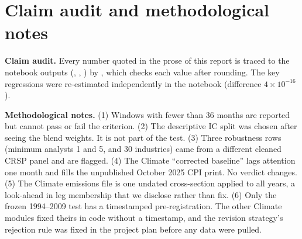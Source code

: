 \documentclass[11pt]{article}
\begin{document}
\section{Claim audit and methodological notes}
\label{app:audit}
\enlargethispage{\baselineskip}

\textbf{Claim audit.} Every number quoted in the prose of this report is traced to the notebook outputs (, , ) by , which checks each value after rounding. The key regressions were re-estimated independently in the notebook (difference $4\times10^{-16}$).

\textbf{Methodological notes.} (1) Windows with fewer than 36 months are reported but cannot pass or fail the criterion. (2) The descriptive IC split was chosen after seeing the blend weights. It is not part of the test. (3) Three robustness rows (minimum analysts 1 and 5, and 30 industries) came from a different cleaned CRSP panel and are flagged. (4) The Climate ``corrected baseline'' lags attention one month and fills the unpublished October 2025 CPI print. No verdict changes. (5) The Climate emissions file is one undated cross-section applied to all years, a look-ahead in leg membership that we disclose rather than fix. (6) Only the frozen 1994--2009 test has a timestamped pre-registration. The other Climate modules fixed theirs in code without a timestamp, and the revision strategy's rejection rule was fixed in the project plan before any data were pulled.
\end{document}

